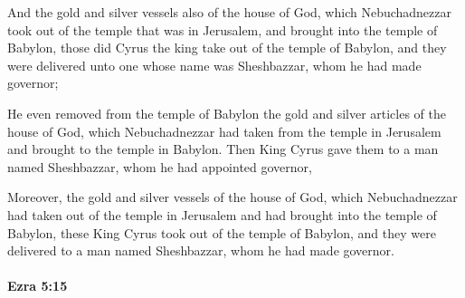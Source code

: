 			\begin{versebox}
					\item[BHS] 
					\item[LXX] 
					\item[ASV] And the gold and silver vessels also of the house of God, which Nebuchadnezzar took out of the temple that was in Jerusalem, and brought into the temple of Babylon, those did Cyrus the king take out of the temple of Babylon, and they were delivered unto one whose name was Sheshbazzar, whom he had made governor;
					\item[NIV] He even removed from the temple of Babylon the gold and silver articles of the house of God, which Nebuchadnezzar had taken from the temple in Jerusalem and brought to the temple in Babylon. Then King Cyrus gave them to a man named Sheshbazzar, whom he had appointed governor,
					\item[NRSV] Moreover, the gold and silver vessels of the house of God, which Nebuchadnezzar had taken out of the temple in Jerusalem and had brought into the temple of Babylon, these King Cyrus took out of the temple of Babylon, and they were delivered to a man named Sheshbazzar, whom he had made governor.
			\end{versebox}

		\paragraph{Ezra 5:15} %
			\label{EZRA-5-15}

